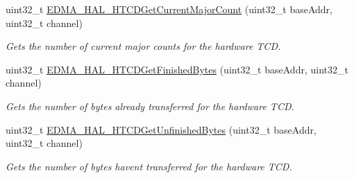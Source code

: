 \begin{DoxyCompactItemize}
uint32\+\_\+t \hyperlink{group__edma__hal_ga0151e924e12a540649527b98f7923d60}{E\+D\+M\+A\+\_\+\+H\+A\+L\+\_\+\+H\+T\+C\+D\+Get\+Current\+Major\+Count} (uint32\+\_\+t base\+Addr, uint32\+\_\+t channel)
\begin{DoxyCompactList}\small\item\em Gets the number of current major counts for the hardware T\+CD. \end{DoxyCompactList}\item 
uint32\+\_\+t \hyperlink{group__edma__hal_ga5e37640a7f57586edeba5a1cc94db473}{E\+D\+M\+A\+\_\+\+H\+A\+L\+\_\+\+H\+T\+C\+D\+Get\+Finished\+Bytes} (uint32\+\_\+t base\+Addr, uint32\+\_\+t channel)
\begin{DoxyCompactList}\small\item\em Gets the number of bytes already transferred for the hardware T\+CD. \end{DoxyCompactList}\item 
uint32\+\_\+t \hyperlink{group__edma__hal_ga5989c80f8a7bbce1448bc5a08e338a15}{E\+D\+M\+A\+\_\+\+H\+A\+L\+\_\+\+H\+T\+C\+D\+Get\+Unfinished\+Bytes} (uint32\+\_\+t base\+Addr, uint32\+\_\+t channel)
\begin{DoxyCompactList}\small\item\em Gets the number of bytes haven\textquotesingle{}t transferred for the hardware T\+CD. \end{DoxyCompactList}\end{DoxyCompactItemize}

